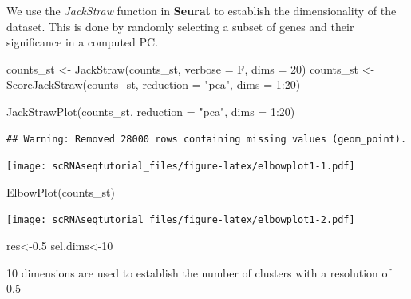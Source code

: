\documentclass[
  openany]{book}
\newenvironment{Shaded}{\begin{snugshade}}{\end{snugshade}}
\newcommand{\AttributeTok}[1]{\textcolor[rgb]{0.77,0.63,0.00}{#1}}
\newcommand{\DecValTok}[1]{\textcolor[rgb]{0.00,0.00,0.81}{#1}}
\newcommand{\FloatTok}[1]{\textcolor[rgb]{0.00,0.00,0.81}{#1}}
\newcommand{\FunctionTok}[1]{\textcolor[rgb]{0.00,0.00,0.00}{#1}}
\newcommand{\NormalTok}[1]{#1}
\newcommand{\OtherTok}[1]{\textcolor[rgb]{0.56,0.35,0.01}{#1}}
\newcommand{\SpecialCharTok}[1]{\textcolor[rgb]{0.00,0.00,0.00}{#1}}
\newcommand{\StringTok}[1]{\textcolor[rgb]{0.31,0.60,0.02}{#1}}
\begin{document}
We use the \emph{JackStraw} function in \textbf{Seurat} to establish the dimensionality of the dataset. This is done by randomly selecting a subset of genes and their significance in a computed PC.

\begin{Shaded}
\begin{Highlighting}[]
\NormalTok{counts\_st }\OtherTok{\textless{}{-}} \FunctionTok{JackStraw}\NormalTok{(counts\_st, }\AttributeTok{verbose =}\NormalTok{ F, }\AttributeTok{dims =} \DecValTok{20}\NormalTok{)}
\NormalTok{counts\_st }\OtherTok{\textless{}{-}}
  \FunctionTok{ScoreJackStraw}\NormalTok{(counts\_st, }\AttributeTok{reduction =} \StringTok{"pca"}\NormalTok{, }\AttributeTok{dims =} \DecValTok{1}\SpecialCharTok{:}\DecValTok{20}\NormalTok{)}
\end{Highlighting}
\end{Shaded}

\begin{Shaded}
\begin{Highlighting}[]
\FunctionTok{JackStrawPlot}\NormalTok{(counts\_st, }\AttributeTok{reduction =} \StringTok{"pca"}\NormalTok{, }\AttributeTok{dims =} \DecValTok{1}\SpecialCharTok{:}\DecValTok{20}\NormalTok{)}
\end{Highlighting}
\end{Shaded}

\begin{verbatim}
## Warning: Removed 28000 rows containing missing values (geom_point).
\end{verbatim}

\texttt{[image: scRNAseqtutorial\_files/figure-latex/elbowplot1-1.pdf]}

\begin{Shaded}
\begin{Highlighting}[]
\FunctionTok{ElbowPlot}\NormalTok{(counts\_st)}
\end{Highlighting}
\end{Shaded}

\texttt{[image: scRNAseqtutorial\_files/figure-latex/elbowplot1-2.pdf]}

\begin{Shaded}
\begin{Highlighting}[]
\NormalTok{res}\OtherTok{\textless{}{-}}\FloatTok{0.5}
\NormalTok{sel.dims}\OtherTok{\textless{}{-}}\DecValTok{10}
\end{Highlighting}
\end{Shaded}

10 dimensions are used to establish the number of clusters with a resolution of 0.5
\end{document}
